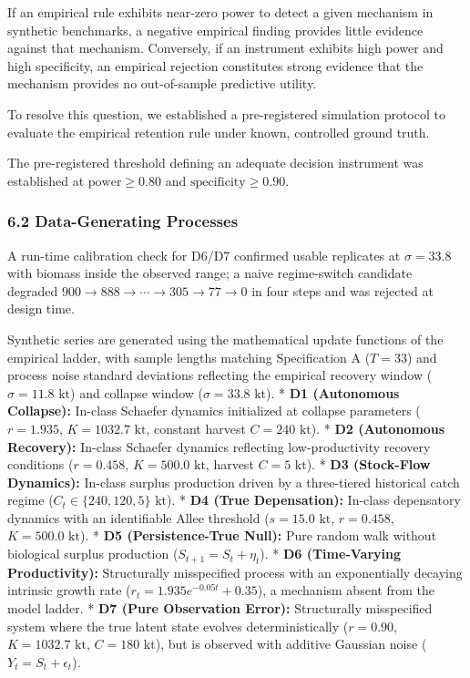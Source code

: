 \documentclass[11pt]{article}
\begin{document}
If an empirical rule exhibits near-zero power to detect a given
mechanism in synthetic benchmarks, a negative empirical finding provides
little evidence against that mechanism. Conversely, if an instrument
exhibits high power and high specificity, an empirical rejection
constitutes strong evidence that the mechanism provides no out-of-sample
predictive utility.

To resolve this question, we established a pre-registered simulation
protocol to evaluate the empirical retention rule under known,
controlled ground truth.

The pre-registered threshold defining an adequate decision instrument
was established at \(\text{power} \ge 0.80\) and
\(\text{specificity} \ge 0.90\).

\subsubsection{6.2 Data-Generating
Processes}\label{data-generating-processes}

A run-time calibration check for D6/D7 confirmed usable replicates at
\(\sigma = 33.8\) with biomass inside the observed range; a naive
regime-switch candidate degraded
\(900 \to 888 \to \cdots \to 305 \to 77 \to 0\) in four steps and was
rejected at design time.

Synthetic series are generated using the mathematical update functions
of the empirical ladder, with sample lengths matching Specification A
(\(T = 33\)) and process noise standard deviations reflecting the
empirical recovery window (\(\sigma = 11.8\text{ kt}\)) and collapse
window (\(\sigma = 33.8\text{ kt}\)). * \textbf{D1 (Autonomous
Collapse):} In-class Schaefer dynamics initialized at collapse
parameters (\(r = 1.935\), \(K = 1032.7\text{ kt}\), constant harvest
\(C = 240\text{ kt}\)). * \textbf{D2 (Autonomous Recovery):} In-class
Schaefer dynamics reflecting low-productivity recovery conditions
(\(r = 0.458\), \(K = 500.0\text{ kt}\), harvest \(C = 5\text{ kt}\)). *
\textbf{D3 (Stock-Flow Dynamics):} In-class surplus production driven by
a three-tiered historical catch regime
(\(C_t \in \{240, 120, 5\}\text{ kt}\)). * \textbf{D4 (True
Depensation):} In-class depensatory dynamics with an identifiable Allee
threshold (\(s = 15.0\text{ kt}\), \(r = 0.458\),
\(K = 500.0\text{ kt}\)). * \textbf{D5 (Persistence-True Null):} Pure
random walk without biological surplus production
(\(S_{t+1} = S_t + \eta_t\)). * \textbf{D6 (Time-Varying Productivity):}
Structurally misspecified process with an exponentially decaying
intrinsic growth rate (\(r_t = 1.935 e^{-0.05 t} + 0.35\)), a mechanism
absent from the model ladder. * \textbf{D7 (Pure Observation Error):}
Structurally misspecified system where the true latent state evolves
deterministically (\(r = 0.90\), \(K = 1032.7\text{ kt}\),
\(C = 180\text{ kt}\)), but is observed with additive Gaussian noise
(\(Y_t = S_t + \epsilon_t\)).
\end{document}
